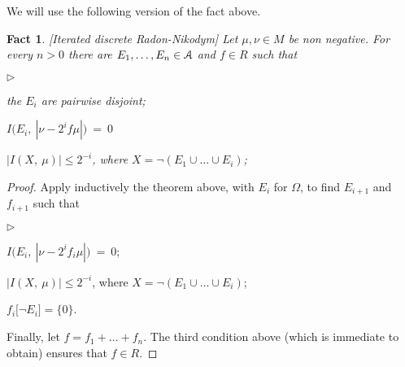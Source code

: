 \documentclass[12pt,letterpaper,oneside,reqno]{amsart}
\newcommand{\mylabel}[1]{{#1}\hfill}
\renewenvironment{itemize}
  {\begin{list}{$\triangleright$}{%
   \setlength{\parskip}{0mm}
   \setlength{\topsep}{.2\baselineskip}
   \setlength{\rightmargin}{0mm}
   \setlength{\listparindent}{0mm}
   \setlength{\itemindent}{0mm}
   \setlength{\labelwidth}{3ex}
   \setlength{\itemsep}{.2\baselineskip}
   \setlength{\parsep}{.2\baselineskip}
   \setlength{\partopsep}{0mm}
   \setlength{\labelsep}{1ex}
   \setlength{\leftmargin}{\labelwidth+\labelsep}
   \let\makelabel\mylabel}}{%
   \end{list}}
\theoremstyle{plain}
\newtheorem{fact}[theorem]{Fact}
\theoremstyle{remark}
\begin{document}
We will use the following version of the fact above.




\begin{fact}\label{thm_fRN2}
  [Iterated discrete Radon-Nikodym]
  Let $\mu,\nu\in M$ be non negative.
  For every $n>0$ there are $E_1,\dots,E_n\in{\EuScript A}$ and $f\in R$ such that
  \begin{itemize}
    \item[0.] the $E_i$ are pairwise disjoint;
    \item[1.] $I\big(E_i,\ |\nu-2^if\mu|\big)\ =\ 0$
    \item[2.] $|I(X,\ \mu)|\le2^{-i}$, where $X=\neg(E_1\cup\dots\cup E_i)$;
  \end{itemize}
\end{fact}


\begin{proof}
  Apply inductively the theorem above, with $E_i$ for $\Omega$, to find $E_{i+1}$ and $f_{i+1}$ such that
  \begin{itemize}
    \item[1$_i$.] $I\big(E_i,\ |\nu-2^if_i\mu|\big)\ =\ 0$;
    \item[2$_i$.] $|I(X,\ \mu)|\le2^{-i}$, where $X=\neg(E_1\cup\dots\cup E_i)$;
    \item[3$_i$.] $f_i\big[\neg E_i]=\{0\}$.
  \end{itemize}
  Finally, let $f=f_1+\dots+f_n$.
  The third condition above (which is immediate to obtain) ensures that $f\in R$.
\end{proof}
\end{document}

